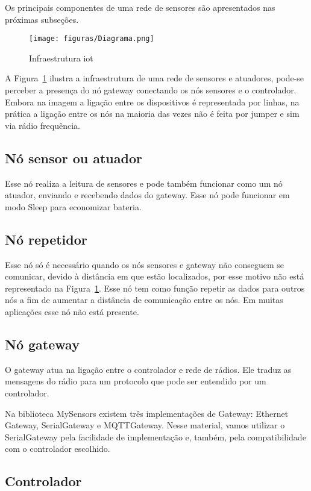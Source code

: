 Os principais componentes de uma rede de sensores são apresentados nas próximas subseções.

\begin{figure}[H]
      \centering
      \texttt{[image: figuras/Diagrama.png]}
      \caption{Infraestrutura iot}
      \label{fig:iot}
\end{figure}

A Figura~\ref{fig:iot} ilustra a infraestrutura de uma rede de sensores e atuadores, pode-se perceber a presença do nó gateway conectando os nós sensores e o controlador. Embora na imagem a ligação entre os dispositivos é representada por linhas, na prática a ligação entre os nós na maioria das vezes não é feita por jumper e sim via rádio frequência. 

\subsection{Nó sensor ou atuador}
	Esse nó realiza a leitura de sensores e pode também funcionar como um nó atuador, enviando e recebendo dados do gateway. Esse nó pode funcionar em modo Sleep para economizar bateria.

\subsection{Nó repetidor}
	Esse nó só é necessário quando os nós sensores e gateway não conseguem se comunicar, devido à distância em que estão localizados, por esse motivo não está representado na Figura~\ref{fig:iot}. Esse nó tem como função repetir as dados para outros nós a fim de aumentar a distância de comunicação entre os nós. Em muitas aplicações esse nó não está presente.

\subsection{Nó gateway}

O gateway atua na ligação entre o controlador e rede de rádios. Ele traduz as mensagens do rádio para um protocolo que pode ser entendido por um controlador. 

Na biblioteca MySensors existem três implementações de Gateway: Ethernet Gateway, SerialGateway e MQTTGateway. Nesse material, vamos utilizar o SerialGateway pela facilidade de implementação e, também, pela compatibilidade com o controlador escolhido.
	
\subsection{Controlador}

